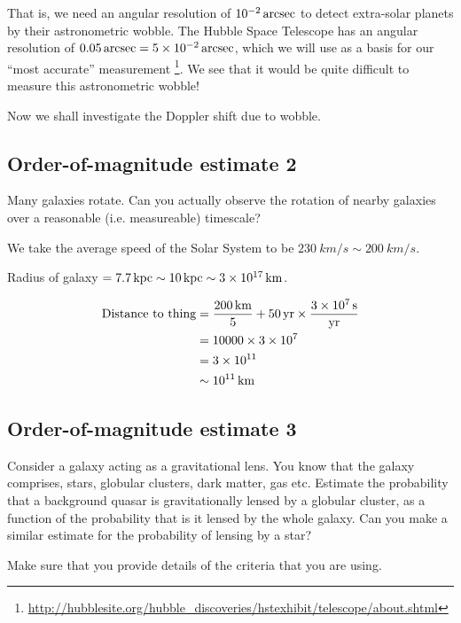\documentclass[a4paper]{article} %
\begin{document}
That is, we need an angular resolution of $\SI{d-2}{arcsec}$ to detect extra-solar planets by their astronometric wobble. The Hubble Space Telescope has an angular resolution of $\SI{0.05}{arcsec}=\SI{5d-2}{arcsec}$, which we will use as a basis for our ``most accurate'' measurement
\footnote{\url{http://hubblesite.org/hubble_discoveries/hstexhibit/telescope/about.shtml}}. We see that it would be quite difficult to measure this astronometric wobble!

Now we shall investigate the Doppler shift due to wobble.



\subsection{Order-of-magnitude estimate 2}
\begin{framed}
Many galaxies rotate. Can you actually observe the rotation of nearby galaxies over a reasonable (i.e. measureable) timescale?
\end{framed}

We take the average speed of the Solar System to be $\SI{230}{km/s}\sim \SI{200}{km/s}$.

Radius of galaxy $= \SI{7.7}{kpc}\sim \SI{10}{kpc}\sim \SI{3d17}{km}$.

\begin{align}
\text{Distance to thing}&=\frac{\SI{200}{km}}{5}+\SI{50}{yr}\times\frac{\SI{3d7}{s}}{\text{yr}}\\
&=10000\times 3\times 10^7\\
&=3\times 10^{11}\\
&\sim \SI{d11}{km}
\end{align}

\subsection{Order-of-magnitude estimate 3}
\begin{framed}
Consider a galaxy acting as a gravitational lens. You know that the galaxy comprises, stars, globular clusters, dark matter, gas etc. Estimate the probability that a background quasar is gravitationally lensed by a globular cluster, as a function of the probability that is it lensed by the whole galaxy. Can you make a similar estimate for the probability of lensing by a star?

Make sure that you provide details of the criteria that you are using.
\end{framed}
\end{document}
